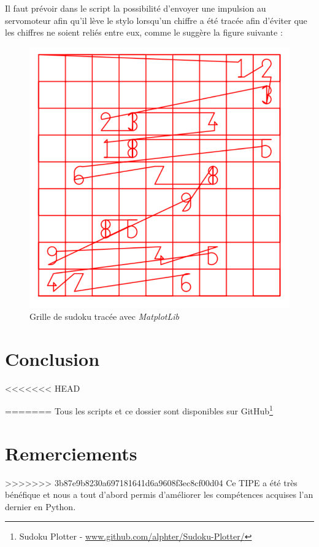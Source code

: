 \documentclass[12pt,a4paper]{report}
\begin{document}
Il faut prévoir dans le script la possibilité d'envoyer une impulsion au servomoteur afin qu'il lève le stylo lorsqu'un chiffre a été tracée afin d'éviter que les chiffres ne soient reliés entre eux, comme le suggère la figure suivante :

\begin{figure}[!h]
 \center
 \includegraphics[scale=0.45]{../pictures/Sudoku_relies}
 \caption{Grille de sudoku tracée avec \emph{MatplotLib}}
\end{figure}

\chapter*{Conclusion}
<<<<<<< HEAD
=======
Tous les scripts et ce dossier sont disponibles sur GitHub\footnote{Sudoku Plotter - \url{www.github.com/alphter/Sudoku-Plotter/}}

\chapter*{Remerciements}

>>>>>>> 3b87e9b8230a697181641d6a9608f3ec8cf00d04
Ce TIPE a été très bénéfique et nous a tout d'abord permis d'améliorer les compétences acquises l'an dernier en Python.
\end{document}
